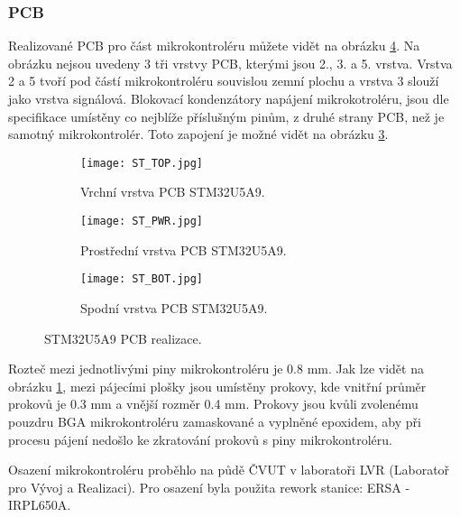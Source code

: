 	\subsubsection{PCB}
	Realizované PCB pro část mikrokontroléru můžete vidět na obrázku \ref{fig:ST_layout}. Na obrázku nejsou uvedeny 3 tři vrstvy PCB, kterými jsou 2., 3. a 5. vrstva. Vrstva 2 a 5 tvoří pod částí mikrokontroléru souvislou zemní plochu a vrstva 3 slouží jako vrstva signálová. Blokovací kondenzátory napájení mikrokotroléru, jsou dle specifikace \cite{STM32U5A9_RM} umístěny co nejblíže příslušným pinům, z druhé strany PCB, než je samotný mikrokontrolér. Toto zapojení je možné vidět na obrázku \ref{fig:ST_BOT}. 
	\begin{figure}[h!]
		\centering
		\captionsetup{justification=centering}
		\begin{subfigure}[b]{0.3\textwidth}
			\centering
			\texttt{[image: ST\_TOP.jpg]}
			\caption{Vrchní vrstva PCB STM32U5A9.}
			\label{fig:ST_TOP}
		\end{subfigure}
		\hfill
		\begin{subfigure}[b]{0.3\textwidth}
			\centering
				\texttt{[image: ST\_PWR.jpg]}
			\caption{Prostřední vrstva PCB STM32U5A9.}
			\label{fig:ST_PWR}
		\end{subfigure}
		\hfill
		\begin{subfigure}[b]{0.3\textwidth}
			\centering
				\texttt{[image: ST\_BOT.jpg]}
			\caption{Spodní vrstva PCB STM32U5A9.}
			\label{fig:ST_BOT}
		\end{subfigure}
		\caption{STM32U5A9 PCB realizace.}
		\label{fig:ST_layout}
	\end{figure}
	Rozteč mezi jednotlivými piny mikrokontroléru je 0.8 mm. Jak lze vidět na obrázku \ref{fig:ST_TOP}, mezi pájecími plošky jsou umístěny prokovy, kde vnitřní průměr prokovů je 0.3 mm a vnější rozměr 0.4 mm. Prokovy jsou kvůli zvolenému pouzdru BGA mikrokontroléru zamaskované a vyplněné epoxidem, aby při procesu pájení nedošlo ke zkratování prokovů s piny mikrokontroléru.
	\par Osazení mikrokontroléru proběhlo na půdě ČVUT v laboratoři LVR (Laboratoř pro Vývoj a Realizaci). Pro osazení byla použita rework stanice: ERSA - IRPL650A.
	
